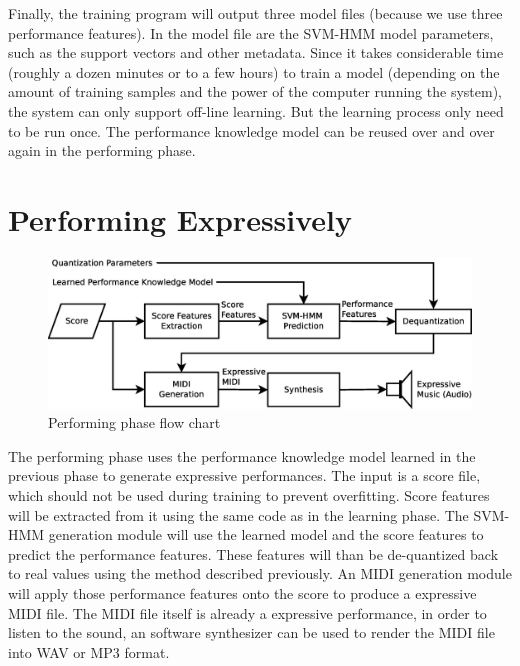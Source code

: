 Finally, the training program will output three model files (because we use three performance features). In the model file are the SVM-HMM model parameters, such as the support vectors and other metadata.  Since it takes considerable time (roughly a dozen minutes or to a few hours) to train a model (depending on the amount of training samples and the power of the computer running the system), the system can only support off-line learning. But the learning process only need to be run once. The performance knowledge model can be reused over and over again in the performing phase.



\section{Performing Expressively}
   \begin{figure}[tp]
      \begin{center}
         \includegraphics[width=\textwidth]{fig/perf_arch}
      \end{center}
      \caption{Performing phase flow chart} 
      \label{fig:perfflow}
   \end{figure}
The performing phase uses the performance knowledge model learned in the previous phase to generate expressive performances. The input is a score file, which should not be used during training to prevent overfitting. Score features will be extracted from it using the same code as in the learning phase. The SVM-HMM generation module will use the learned model and the score features to predict the performance features. These features will than be de-quantized back to real values using the method described previously. An MIDI generation module will apply those performance features onto the score to produce a expressive MIDI file. The MIDI file itself is already a expressive performance, in order to listen to the sound, an software synthesizer can be used to render the MIDI file into WAV or MP3 format.
